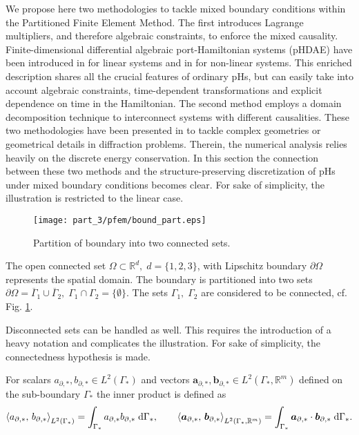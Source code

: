 We propose here two methodologies to tackle mixed boundary conditions within the Partitioned Finite Element Method. The first introduces Lagrange multipliers, and therefore algebraic constraints, to enforce the mixed causality. Finite-dimensional differential algebraic port-Hamiltonian systems (pHDAE) have been introduced in \cite{beattie2018linear} for linear systems and in \cite{mehrmann2019structurepreserving} for non-linear systems. This enriched description shares all the crucial features of ordinary pHs, but can easily take into account algebraic constraints, time-dependent transformations and explicit dependence on time in the Hamiltonian. The second method employs a domain decomposition technique to interconnect systems with different causalities. These two methodologies have been presented in \cite{joly2003variational} to tackle complex geometries or geometrical details in diffraction problems. Therein, the numerical analysis relies heavily on the discrete energy conservation. In this section the connection between these two methods and the structure-preserving discretization of pHs under mixed boundary conditions becomes clear. For sake of simplicity, the illustration is restricted to the linear case. \\

\begin{figure}[tb]
	\centering
	\texttt{[image: part\_3/pfem/bound\_part.eps]}
	\caption{Partition of boundary into two connected sets.}
	\label{fig:bound_part}
\end{figure}

The open connected set $\Omega \subset \mathbb{R}^d, \; d=\{1,2,3\}$, with Lipschitz boundary $\partial\Omega$ represents the spatial domain. The boundary is partitioned into two sets $\partial\Omega = \overline{\Gamma}_1 \cup \overline{\Gamma}_2, \; \Gamma_1 \cap \Gamma_2 = \{\emptyset\}$. The sets $\Gamma_1, \; \Gamma_2$ are considered to be connected, cf. Fig. \ref{fig:bound_part}.

\begin{remark}
	Disconnected sets can be handled as well. This requires the introduction of a heavy notation and complicates the illustration. For sake of simplicity, the connectedness hypothesis is made.
\end{remark}
For scalars ${a}_{\partial, *}, {b}_{\partial, *} \in L^2(\Gamma_*)$ and  vectors  $\bm{a}_{\partial, *}, \bm{b}_{\partial, *} \in L^2(\Gamma_*, \mathbb{R}^m)$ defined on the sub-boundary $\Gamma_*$ the inner product is defined as
\begin{equation}
\inner[L^2(\Gamma_*)]{a_{\partial, *}}{b_{\partial, *}} = \int_{\Gamma_*} a_{\partial, *} b_{\partial, *} \d{\Gamma_*}, \qquad \inner[L^2(\Gamma_*, \mathbb{R}^m)]{\bm{a}_{\partial, *}}{\bm{b}_{\partial, *}} = \int_{\Gamma_*} \bm{a}_{\partial, *} \cdot \bm{b}_{\partial, *} \d{\Gamma_*}.  
\end{equation}   

